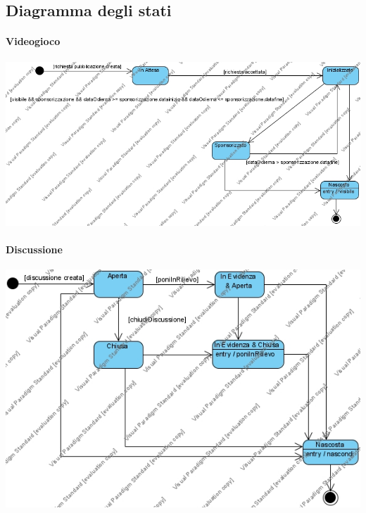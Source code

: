 \newpage
\subsection{Diagramma degli stati}
\paragraph{Videogioco}
\begin{center}
\includegraphics[width=\textwidth,height=\textheight,keepaspectratio]{Figure/StateDiagrams/Videogioco.jpg}
\end{center}

\paragraph{Discussione}
\begin{center}
\includegraphics[width=\textwidth,height=\textheight,keepaspectratio]{Figure/StateDiagrams/Discussione.jpg}
\end{center}

\newpage
